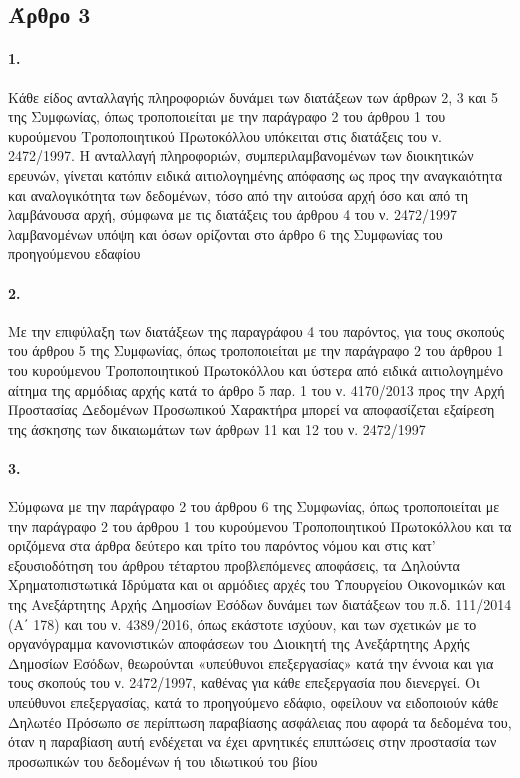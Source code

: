 \documentclass[a4paper,oneside, 10pt]{book}
\begin{document}
\subsection*{ Άρθρο 3 }
\paragraph { 1. } Κάθε είδος ανταλλαγής πληροφοριών δυνάμει των διατάξεων των άρθρων 2, 3 και 5 της Συμφωνίας, όπως τροποποιείται με την παράγραφο 2 του άρθρου 1 του κυρούμενου Τροποποιητικού Πρωτοκόλλου υπόκειται στις διατάξεις του ν. 2472/1997. Η ανταλλαγή πληροφοριών, συμπεριλαμβανομένων των διοικητικών ερευνών, γίνεται κατόπιν ειδικά αιτιολογημένης απόφασης ως προς την αναγκαιότητα και αναλογικότητα των δεδομένων, τόσο από την αιτούσα αρχή όσο και από τη λαμβάνουσα αρχή, σύμφωνα με τις διατάξεις του άρθρου 4 του ν. 2472/1997 λαμβανομένων υπόψη και όσων ορίζονται στο άρθρο 6 της Συμφωνίας του προηγούμενου εδαφίου
\paragraph { 2. } Με την επιφύλαξη των διατάξεων της παραγράφου 4 του παρόντος, για τους σκοπούς του άρθρου 5 της Συμφωνίας, όπως τροποποιείται με την παράγραφο 2 του άρθρου 1 του κυρούμενου Τροποποιητικού Πρωτοκόλλου και ύστερα από ειδικά αιτιολογημένο αίτημα της αρμόδιας αρχής κατά το άρθρο 5 παρ. 1 του ν. 4170/2013 προς την Αρχή Προστασίας Δεδομένων Προσωπικού Χαρακτήρα μπορεί να αποφασίζεται εξαίρεση της άσκησης των δικαιωμάτων των άρθρων 11 και 12 του ν. 2472/1997
\paragraph { 3. } Σύμφωνα με την παράγραφο 2 του άρθρου 6 της Συμφωνίας, όπως τροποποιείται με την παράγραφο 2 του άρθρου 1 του κυρούμενου Τροποποιητικού Πρωτοκόλλου και τα οριζόμενα στα άρθρα δεύτερο και τρίτο του παρόντος νόμου και στις κατ’ εξουσιοδότηση του άρθρου τέταρτου προβλεπόμενες αποφάσεις, τα Δηλούντα Χρηματοπιστωτικά Ιδρύματα και οι αρμόδιες αρχές του Υπουργείου Οικονομικών και της Ανεξάρτητης Αρχής Δημοσίων Εσόδων δυνάμει των διατάξεων του π.δ. 111/2014 (Α΄ 178) και του ν. 4389/2016, όπως εκάστοτε ισχύουν, και των σχετικών με το οργανόγραμμα κανονιστικών αποφάσεων του Διοικητή της Ανεξάρτητης Αρχής Δημοσίων Εσόδων, θεωρούνται «υπεύθυνοι επεξεργασίας» κατά την έννοια και για τους σκοπούς του ν. 2472/1997, καθένας για κάθε επεξεργασία που διενεργεί. Οι υπεύθυνοι επεξεργασίας, κατά το προηγούμενο εδάφιο, οφείλουν να ειδοποιούν κάθε Δηλωτέο Πρόσωπο σε περίπτωση παραβίασης ασφάλειας που αφορά τα δεδομένα του, όταν η παραβίαση αυτή ενδέχεται να έχει αρνητικές επιπτώσεις στην προστασία των προσωπικών του δεδομένων ή του ιδιωτικού του βίου
\end{document}
